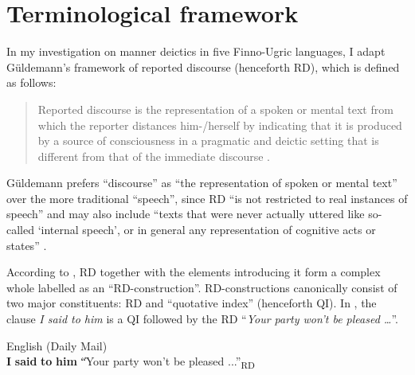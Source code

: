 \documentclass[output=paper,colorlinks,citecolor=brown]{langscibook}
\begin{document}
\section{Terminological framework}\label{sec:teptiuk:2}

In my investigation on manner deictics in five Finno-Ugric languages, I adapt Güldemann’s framework of reported discourse (henceforth RD), which is defined as follows:

\begin{quote}
Reported discourse is the representation of a spoken or mental text from which the reporter distances him-/herself by indicating that it is produced by a source of consciousness in a pragmatic and deictic setting that is different from that of the immediate discourse \citep[6]{Güldemann2008}.
\end{quote}

Güldemann prefers “discourse” as “the representation of spoken or mental text” over the more traditional “speech”, since RD “is not restricted to real instances of speech” and may also include “texts that were never actually uttered like so-called ‘internal speech’, or in general any representation of cognitive acts or states” \citep[7]{Güldemann2008}.

According to \citet[10]{Güldemann2008}, RD together with the elements introducing it form a complex whole labelled as an “RD-construction”. RD-constructions canonically consist of two major constituents: RD and “quotative index” (henceforth QI). In , the clause \textit{I said to him} is a QI followed by the RD “\textit{Your party won’t be pleased …}”.

\ea\label{ex:teptiuk:2}
{English (Daily Mail)}\\
 \textbf{I} \textbf{said} \textbf{to} \textbf{him} \|“Your party won’t be pleased ...”\|\textsubscript{RD}\\
 \z
\end{document}
